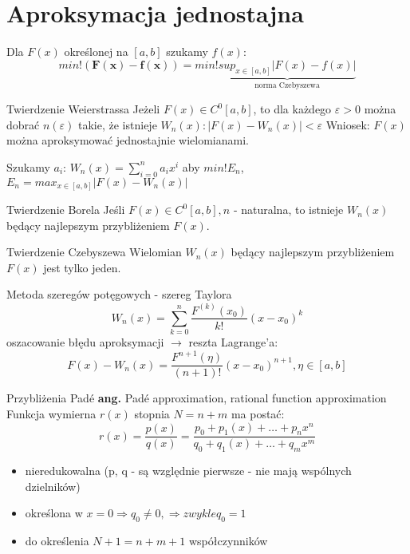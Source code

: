 \section{Aproksymacja jednostajna}
\begin{frame}
	Dla $F(x)$ określonej na $[a,b]$ szukamy $f(x)$:
    $$min! (\mathbf{F(x)-f(x)}) = min!\underbrace{sup_{x \in [a,b]}|F(x)-f(x)|}_{\text{norma Czebyszewa}}$$
\end{frame}
\begin{frame}
	\begin{block}{Twierdzenie Weierstrassa}
	Jeżeli $F(x) \in C^0[a,b]$, to dla każdego $\varepsilon>0$ można dobrać $n(\varepsilon)$ takie, że istnieje $W_n(x): |F(x)-W_n(x)|<\varepsilon$ \newline
    \newline Wniosek: $F(x)$ można aproksymować jednostajnie wielomianami.
	\end{block}
    Szukamy $a_i$:\newline
    $W_n(x) = \sum_{i=0}^{n}a_ix^i$ aby $min!E_n$, \newline
    $E_n = max_{x \in [a,b]} |F(x) - W_n(x)|$
\end{frame}
\begin{frame}
	\begin{block}{Twierdzenie Borela}
		Jeśli $F(x)\in C^0[a,b], n$ - naturalna, to istnieje $W_n(x)$ będący najlepszym przybliżeniem $F(x)$.
	\end{block}
    \begin{block}{Twierdzenie Czebyszewa}
    	Wielomian $W_n(x)$ będący najlepszym przybliżeniem $F(x)$ jest tylko jeden.
    \end{block}
\end{frame}
\begin{frame}{Metoda szeregów potęgowych - szereg Taylora}
	$$W_n(x) = \sum_{k=0}^{n}\frac{F^{(k)}(x_0)}{k!}(x-x_0)^k$$
    oszacowanie błędu aproksymacji $\rightarrow$ reszta Lagrange'a:
    $$F(x)-W_n(x) = \frac{F^{n+1}(\eta)}{(n+1)!}(x-x_0)^{n+1},\eta \in [a,b]$$
\end{frame}
\begin{frame}{Przybliżenia Padé}
	\textbf{ang.} Padé approximation, rational function approximation \newline
    \newline
    Funkcja wymierna $r(x)$ stopnia $N = n+m$ ma postać:
    $$r(x) = \frac{p(x)}{q(x)} = \frac{p_0+p_1(x)+\ldots+p_nx^n}{q_0+q_1(x)+\ldots+q_mx^m}$$
    \begin{itemize}
    \item nieredukowalna (p, q - są względnie pierwsze - nie mają wspólnych dzielników)
    \item określona w $x=0\Rightarrow q_0 \not = 0, \Rightarrow zwykle q_0=1$
    \item do określenia $N+1 = n+m+1$ współczynników
    \end{itemize}
\end{frame}
